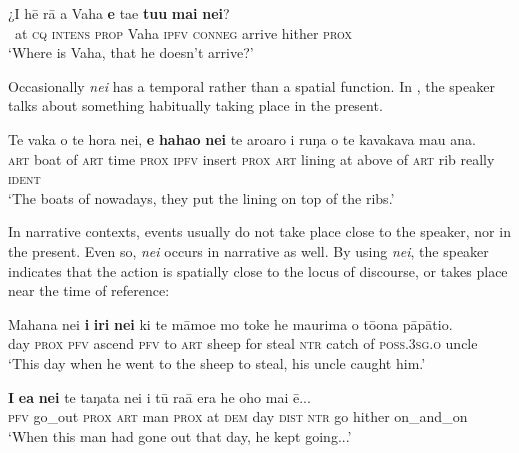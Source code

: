 \ea\label{ex:7.156}
\gll ¿{\ꞌ}I hē rā a Vaha \textbf{e} ta{\ꞌ}e \textbf{tu{\ꞌ}u} \textbf{mai} \textbf{nei}? \\
~at \textsc{cq} \textsc{intens} \textsc{prop} Vaha \textsc{ipfv} \textsc{conneg} arrive hither \textsc{prox} \\

\glt
‘Where is Vaha, that he doesn’t arrive?’ \textstyleExampleref{[R229.131]} 
\z

Occasionally \textit{nei} has a temporal rather than a spatial function. In , the speaker talks about something habitually taking place in the present.

\ea\label{ex:7.157}
\gll Te vaka o te hora nei, \textbf{e} \textbf{haha{\ꞌ}o} \textbf{nei} te aroaro {\ꞌ}i ruŋa  o te kavakava mau {\ꞌ}ana.\\
\textsc{art} boat of \textsc{art} time \textsc{prox} \textsc{ipfv} insert \textsc{prox} \textsc{art} lining at above  of \textsc{art} rib really \textsc{ident}\\

\glt 
‘The boats of nowadays, they put the lining on top of the ribs.’ \textstyleExampleref{[R200.068]} 
\z

In narrative contexts, events usually do not take place close to the speaker, nor in the present. Even so, \textit{nei} occurs in narrative as well. By using \textit{nei}, the speaker indicates that the action is spatially close to the locus of discourse, or takes place near the time of reference:

\ea\label{ex:7.158}
\gll Mahana nei \textbf{i} \textbf{iri} \textbf{nei} ki te māmoe mo toke he ma{\ꞌ}urima  o tō{\ꞌ}ona pāpātio.\\
day \textsc{prox} \textsc{pfv} ascend \textsc{pfv} to \textsc{art} sheep for steal \textsc{ntr} catch  of \textsc{poss.3sg.o} uncle\\

\glt 
‘This day when he went to the sheep to steal, his uncle caught him.’ \textstyleExampleref{[R250.222]} 
\z

\ea\label{ex:7.159}
\gll \textbf{I} \textbf{e{\ꞌ}a} \textbf{nei} te taŋata nei {\ꞌ}i tū ra{\ꞌ}ā era he oho mai ē... \\
\textsc{pfv} go\_out \textsc{prox} \textsc{art} man \textsc{prox} at \textsc{dem} day \textsc{dist} \textsc{ntr} go hither on\_and\_on \\

\glt
‘When this man had gone out that day, he kept going...’ \textstyleExampleref{[R310.136]} 
\z

